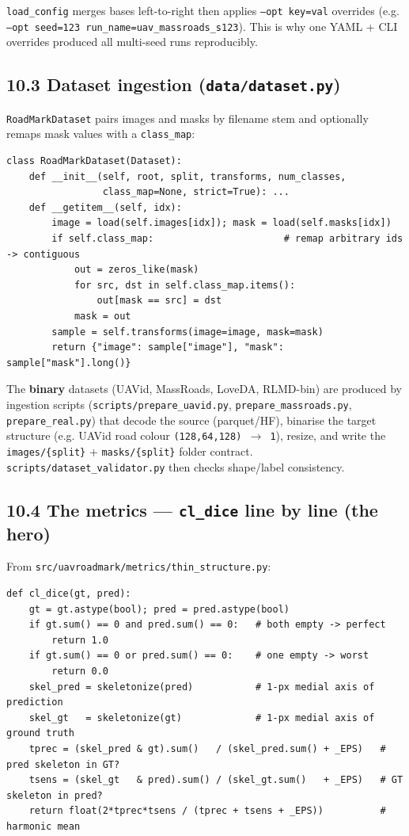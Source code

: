 \documentclass[11pt]{article}
\begin{document}
\texttt{load\_config} merges bases left-to-right then applies \texttt{--opt key=val} overrides (e.g. \texttt{--opt seed=123 run\_name=uav\_massroads\_s123}). This is why one YAML + CLI overrides produced all multi-seed runs reproducibly.

\subsection*{10.3 Dataset ingestion (\texttt{data/dataset.py})}

\texttt{RoadMarkDataset} pairs images and masks by filename stem and optionally remaps mask values with a \texttt{class\_map}:

\begin{Verbatim}[breaklines=true,breakanywhere=true,fontsize=\footnotesize]
class RoadMarkDataset(Dataset):
    def __init__(self, root, split, transforms, num_classes,
                 class_map=None, strict=True): ...
    def __getitem__(self, idx):
        image = load(self.images[idx]); mask = load(self.masks[idx])
        if self.class_map:                       # remap arbitrary ids -> contiguous
            out = zeros_like(mask)
            for src, dst in self.class_map.items():
                out[mask == src] = dst
            mask = out
        sample = self.transforms(image=image, mask=mask)
        return {"image": sample["image"], "mask": sample["mask"].long()}
\end{Verbatim}

The \textbf{binary} datasets (UAVid, MassRoads, LoveDA, RLMD-bin) are produced by ingestion scripts (\texttt{scripts/prepare\_uavid.py}, \texttt{prepare\_massroads.py}, \texttt{prepare\_real.py}) that decode the source (parquet/HF), binarise the target structure (e.g. UAVid road colour \texttt{(128,64,128) $\rightarrow$ 1}), resize, and write the \texttt{images/\{split\}} + \texttt{masks/\{split\}} folder contract. \texttt{scripts/dataset\_validator.py} then checks shape/label consistency.

\subsection*{10.4 The metrics --- \texttt{cl\_dice} line by line (the hero)}

From \texttt{src/uavroadmark/metrics/thin\_structure.py}:

\begin{Verbatim}[breaklines=true,breakanywhere=true,fontsize=\footnotesize]
def cl_dice(gt, pred):
    gt = gt.astype(bool); pred = pred.astype(bool)
    if gt.sum() == 0 and pred.sum() == 0:   # both empty -> perfect
        return 1.0
    if gt.sum() == 0 or pred.sum() == 0:    # one empty -> worst
        return 0.0
    skel_pred = skeletonize(pred)           # 1-px medial axis of prediction
    skel_gt   = skeletonize(gt)             # 1-px medial axis of ground truth
    tprec = (skel_pred & gt).sum()   / (skel_pred.sum() + _EPS)   # pred skeleton in GT?
    tsens = (skel_gt   & pred).sum() / (skel_gt.sum()   + _EPS)   # GT skeleton in pred?
    return float(2*tprec*tsens / (tprec + tsens + _EPS))          # harmonic mean
\end{Verbatim}
\end{document}

